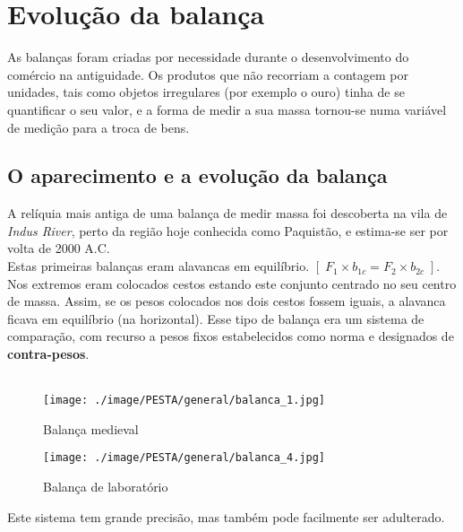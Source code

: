 \chapter{Evolução da balança}
As balanças foram criadas por necessidade durante o desenvolvimento do comércio na antiguidade. Os produtos que não recorriam a contagem por unidades, tais como objetos irregulares (por exemplo o ouro) tinha de se quantificar o seu valor, e a forma de medir a sua massa tornou-se numa variável de medição para a troca de bens.
\section{O aparecimento e a evolução da balança}
A relíquia mais antiga de uma balança de medir massa foi descoberta na vila de \textit{Indus River}, perto da região hoje conhecida como Paquistão, e estima-se ser por volta de 2000 A.C.
\\
Estas primeiras balanças eram alavancas em equilíbrio. $[ \; F_{1} \times b_{1c} = F_{2} \times b_{2c} \; ]$. Nos extremos eram colocados cestos estando este conjunto centrado no seu centro de massa. Assim, se os pesos colocados nos dois cestos fossem iguais, a alavanca ficava em equilíbrio (na horizontal). Esse tipo de balança era um sistema de comparação, com recurso a pesos fixos estabelecidos como norma e designados de \textbf{contra-pesos}.
\\
\\
\begin{minipage}[!b]{0.5\linewidth}
	\begin{figure}[H]
		\flushleft
		\texttt{[image: ./image/PESTA/general/balanca\_1.jpg]}
		\caption{Balança medieval}
		\label{balanca_1}
	\end{figure}
\end{minipage}
\hspace{1cm}
\begin{minipage}[!b]{0.5\linewidth}
	\begin{figure}[H]
		\centering
		\texttt{[image: ./image/PESTA/general/balanca\_4.jpg]}
		\caption{Balança de laboratório}
		\label{balanca_4}
	\end{figure}
\end{minipage}
Este sistema tem grande precisão, mas também pode facilmente ser adulterado.
\\
\\
